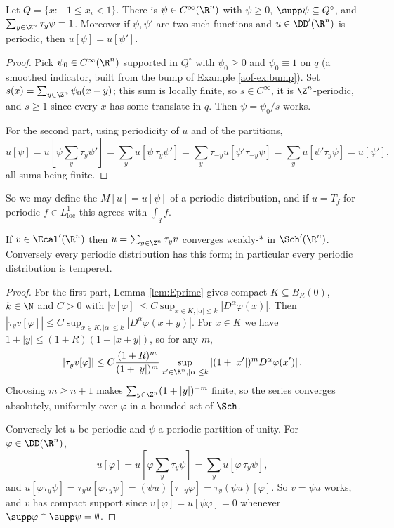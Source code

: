 \begin{lemma}\label{lem:partunity}
	Let $Q=\{x:-1\le x_i<1\}$. There is $\psi\in C^\infty(\R^n)$ with $\psi\ge0$, $\supp\psi\subseteq Q^\circ$, and $\sum_{y\in\Z^n}\tau_y\psi=1$. Moreover if $\psi,\psi'$ are two such functions and $u\in\DD'(\R^n)$ is periodic, then $u[\psi]=u[\psi']$.
\end{lemma}

\begin{proof}
	Pick $\psi_0\in C^\infty(\R^n)$ supported in $Q^\circ$ with $\psi_0\ge0$ and $\psi_0\equiv1$ on $q$ (a smoothed indicator, built from the bump of Example \ref{aof-ex:bump}). Set $s(x)=\sum_{y\in\Z^n}\psi_0(x-y)$; this sum is locally finite, so $s\in C^\infty$, it is $\Z^n$-periodic, and $s \ge 1$ since every $x$ has some translate in $q$. Then $\psi=\psi_0/s$ works.

	For the second part, using periodicity of $u$ and of the partitions,
	$$u[\psi]=u\!\left[\psi\sum_{y}\tau_y\psi'\right]=\sum_yu[\psi\,\tau_y\psi']=\sum_y\tau_{-y}u[\psi'\tau_{-y}\psi]=\sum_yu[\psi'\tau_y\psi]=u[\psi'],$$
	all sums being finite.
\end{proof}

So we may define the  $M[u]=u[\psi]$ of a periodic distribution, and if $u = T_f$ for periodic $f\in L^1_{\mathrm{loc}}$ this agrees with $\int_qf$.

\begin{lemma}\label{lem:periodictempered}
	If $v\in\Ecal'(\R^n)$ then $u=\sum_{y\in\Z^n}\tau_yv$ converges weakly-$*$ in $\Sch'(\R^n)$. Conversely every periodic distribution has this form; in particular every periodic distribution is tempered.
\end{lemma}

\begin{proof}
	For the first part, Lemma \ref{lem:Eprime} gives compact $K \subseteq B_R(0)$, $k\in\N$ and $C>0$ with $|v[\varphi]|\le C\sup_{x\in K,|\alpha|\le k}|D^\alpha\varphi(x)|$. Then $|\tau_yv[\varphi]|\le C\sup_{x\in K,|\alpha|\le k}|D^\alpha\varphi(x+y)|$. For $x \in K$ we have $1+|y|\le(1+R)(1+|x+y|)$, so for any $m$,
	$$|\tau_yv[\varphi]|\le C\frac{(1+R)^m}{(1+|y|)^m}\sup_{x'\in\R^n,|\alpha|\le k}\left|(1+|x'|)^mD^\alpha\varphi(x')\right|.$$
	Choosing $m \ge n+1$ makes $\sum_{y\in\Z^n}(1+|y|)^{-m}$ finite, so the series converges absolutely, uniformly over $\varphi$ in a bounded set of $\Sch$.

	Conversely let $u$ be periodic and $\psi$ a periodic partition of unity. For $\varphi\in\DD(\R^n)$,
	$$u[\varphi]=u\!\left[\varphi\sum_y\tau_y\psi\right]=\sum_yu[\varphi\,\tau_y\psi],$$
	and $u[\varphi\tau_y\psi]=\tau_yu[\varphi\tau_y\psi]=(\psi u)[\tau_{-y}\varphi]=\tau_y(\psi u)[\varphi]$. So $v=\psi u$ works, and $v$ has compact support since $v[\varphi]=u[\psi\varphi]=0$ whenever $\supp\varphi\cap\supp\psi=\emptyset$.
\end{proof}

